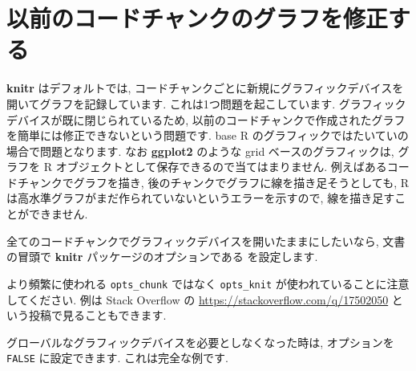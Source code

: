 \documentclass[
  11pt,
  lualatex,
  ja=standard]{bxjsreport}
\newenvironment{Shaded}{\begin{snugshade}}{\end{snugshade}}
\newcommand{\AttributeTok}[1]{\textcolor[rgb]{0.77,0.63,0.00}{#1}}
\newcommand{\ConstantTok}[1]{\textcolor[rgb]{0.00,0.00,0.00}{#1}}
\newcommand{\FunctionTok}[1]{\textcolor[rgb]{0.00,0.00,0.00}{#1}}
\newcommand{\NormalTok}[1]{#1}
\newcommand{\SpecialCharTok}[1]{\textcolor[rgb]{0.00,0.00,0.00}{#1}}
\begin{document}
\hypertarget{global-device}{%
\section{以前のコードチャンクのグラフを修正する}\label{global-device}}

\textbf{knitr} はデフォルトでは, コードチャンクごとに新規にグラフィックデバイスを開いてグラフを記録しています. これは1つ問題を起こしています. グラフィックデバイスが既に閉じられているため, 以前のコードチャンクで作成されたグラフを簡単には修正できないという問題です. base R のグラフィックではたいていの場合で問題となります. なお \textbf{ggplot2} \autocite{R-ggplot2} のような grid ベースのグラフィックは, グラフを R オブジェクトとして保存できるので当てはまりません. 例えばあるコードチャンクでグラフを描き, 後のチャンクでグラフに線を描き足そうとしても, R は高水準グラフがまだ作られていないというエラーを示すので, 線を描き足すことができません.

全てのコードチャンクでグラフィックデバイスを開いたままにしたいなら, 文書の冒頭で \textbf{knitr} パッケージのオプションである  を設定します.

\begin{Shaded}
\end{Shaded}

より頻繁に使われる \texttt{opts\_chunk} ではなく \texttt{opts\_knit} が使われていることに注意してください. 例は Stack Overflow の \url{https://stackoverflow.com/q/17502050} という投稿で見ることもできます.

グローバルなグラフィックデバイスを必要としなくなった時は, オプションを \texttt{FALSE} に設定できます. これは完全な例です.
\end{document}
